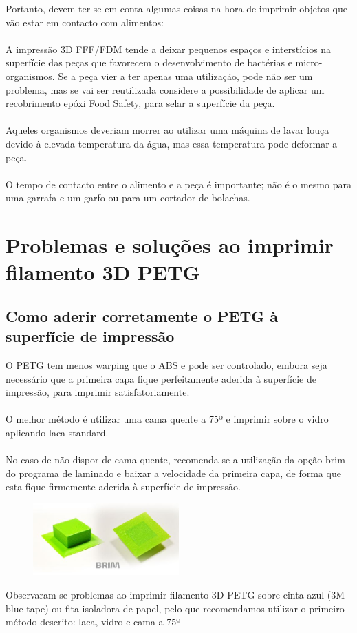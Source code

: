 \documentclass[11pt,a4paper]{article}
\begin{document}
Portanto, devem ter-se em conta algumas coisas na hora de imprimir objetos que vão estar em contacto com alimentos:
\\\\
A impressão 3D FFF/FDM tende a deixar pequenos espaços e interstícios na superfície das peças que favorecem o desenvolvimento de bactérias e micro-organismos. Se a peça vier a ter apenas uma utilização, pode não ser um problema, mas se vai ser reutilizada considere a possibilidade de aplicar um recobrimento epóxi Food Safety, para selar a superfície da peça. 
\\\\
Aqueles organismos deveriam morrer ao utilizar uma máquina de lavar louça devido à elevada temperatura da água, mas essa temperatura pode deformar a peça.
\\\\
O tempo de contacto entre o alimento e a peça é importante; não é o mesmo para uma garrafa e um garfo ou para um cortador de bolachas.
\section{Problemas e soluções ao imprimir filamento 3D PETG}
	\subsection{Como aderir corretamente o PETG à superfície de impressão}O PETG tem menos warping que o ABS e pode ser controlado, embora seja necessário que a primeira capa fique perfeitamente aderida à superfície de impressão, para imprimir satisfatoriamente.
\\\\
O melhor método é utilizar uma cama quente a 75º e imprimir sobre o vidro aplicando laca standard.
\\\\
No caso de não dispor de cama quente, recomenda-se a utilização da opção brim do programa de laminado e baixar a velocidade da primeira capa, de forma que esta fique firmemente aderida à superfície de impressão.
\begin{figure}[H]
\centering
\includegraphics[width=0.5\textwidth,cfbox=azul_marcos 1pt 0pt]{FOTOS/BRIM}
\end{figure}
Observaram-se problemas ao imprimir filamento 3D PETG sobre cinta azul (3M blue tape) ou fita isoladora de papel, pelo que recomendamos utilizar o primeiro método descrito: laca, vidro e cama a 75º
\end{document}
